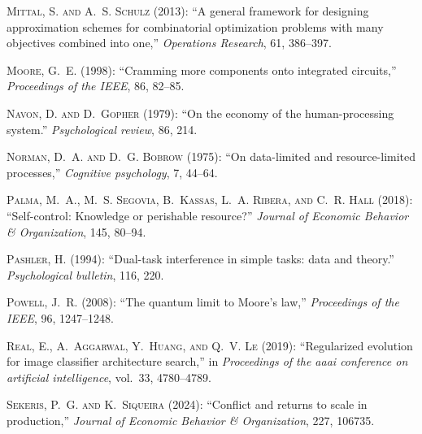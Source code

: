 \documentclass[11pt]{article}
\theoremstyle{definition}
\theoremstyle{remark}
\begin{document}
\begin{thebibliography}{70}
\textsc{Mittal, S. and A.~S. Schulz} (2013): \enquote{A general framework for designing approximation schemes for combinatorial optimization problems with many objectives combined into one,} \emph{Operations Research}, 61, 386--397.

\textsc{Moore, G.~E.} (1998): \enquote{Cramming more components onto integrated circuits,} \emph{Proceedings of the IEEE}, 86, 82--85.

\textsc{Navon, D. and D.~Gopher} (1979): \enquote{On the economy of the human-processing system.} \emph{Psychological review}, 86, 214.

\textsc{Norman, D.~A. and D.~G. Bobrow} (1975): \enquote{On data-limited and resource-limited processes,} \emph{Cognitive psychology}, 7, 44--64.

\textsc{Palma, M.~A., M.~S. Segovia, B.~Kassas, L.~A. Ribera, and C.~R. Hall} (2018): \enquote{Self-control: Knowledge or perishable resource?} \emph{Journal of Economic Behavior \& Organization}, 145, 80--94.

\textsc{Pashler, H.} (1994): \enquote{Dual-task interference in simple tasks: data and theory.} \emph{Psychological bulletin}, 116, 220.

\textsc{Powell, J.~R.} (2008): \enquote{The quantum limit to Moore's law,} \emph{Proceedings of the IEEE}, 96, 1247--1248.

\textsc{Real, E., A.~Aggarwal, Y.~Huang, and Q.~V. Le} (2019): \enquote{Regularized evolution for image classifier architecture search,} in \emph{Proceedings of the aaai conference on artificial intelligence}, vol.~33, 4780--4789.

\textsc{Sekeris, P.~G. and K.~Siqueira} (2024): \enquote{Conflict and returns to scale in production,} \emph{Journal of Economic Behavior \& Organization}, 227, 106735.


\end{thebibliography}
\end{document}
